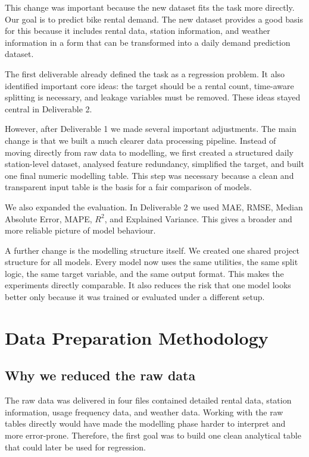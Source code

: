 \documentclass[conference]{IEEEtran}
\begin{document}
This change was important because the new dataset fits the task more directly. Our goal is to predict 
bike rental demand. The new dataset provides a good basis for this because it includes rental data, 
station information, and weather information in a form that can be transformed into a daily demand 
prediction dataset.

The first deliverable already defined the task as a regression problem. It also identified important 
core ideas: the target should be a rental count, time-aware splitting is necessary, and leakage variables 
must be removed. These ideas stayed central in Deliverable 2.

However, after Deliverable 1 we made several important adjustments. The main change is that we built a 
much clearer data processing pipeline. Instead of moving directly from raw data to modelling, we first 
created a structured daily station-level dataset, analysed feature redundancy, simplified the target, 
and built one final numeric modelling table. This step was necessary because a clean and transparent 
input table is the basis for a fair comparison of models.

We also expanded the evaluation. In Deliverable 2 we used MAE, RMSE, Median Absolute Error, MAPE, 
$R^2$, and Explained Variance. This gives a broader and more reliable picture of model behaviour.

A further change is the modelling structure itself. We created one shared project structure for all 
models. Every model now uses the same utilities, the same split logic, the same target variable, and 
the same output format. This makes the experiments directly comparable. It also reduces the risk that 
one model looks better only because it was trained or evaluated under a different setup.

\section{Data Preparation Methodology}
\subsection{Why we reduced the raw data}
The raw data was delivered in four files contained detailed rental data, station information, usage frequency data, and weather 
data. Working with the raw tables directly would have made the modelling phase harder to interpret and 
more error-prone. Therefore, the first goal was to build one clean analytical table 
that could later be used for regression.
\end{document}
